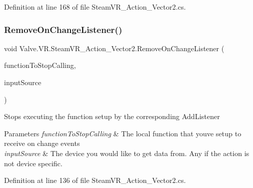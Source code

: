 Definition at line 168 of file Steam\+V\+R\+\_\+\+Action\+\_\+\+Vector2.\+cs.

\mbox{\label{class_valve_1_1_v_r_1_1_steam_v_r___action___vector2_a7449f5403cd5c68579091d9ab4f6084f}} 
\subsubsection{\texorpdfstring{RemoveOnChangeListener()}{RemoveOnChangeListener()}}
{\footnotesize\ttfamily void Valve.\+V\+R.\+Steam\+V\+R\+\_\+\+Action\+\_\+\+Vector2.\+Remove\+On\+Change\+Listener (\begin{DoxyParamCaption}\item[{\mbox{\hyperlink{class_valve_1_1_v_r_1_1_steam_v_r___action___vector2_ad390de62736aedd5be93238b1840ffec}{Change\+Handler}}}]{function\+To\+Stop\+Calling,  }\item[{\mbox{\hyperlink{namespace_valve_1_1_v_r_a82e5bf501cc3aa155444ee3f0662853f}{Steam\+V\+R\+\_\+\+Input\+\_\+\+Sources}}}]{input\+Source }\end{DoxyParamCaption})}



Stops executing the function setup by the corresponding Add\+Listener 


\begin{DoxyParams}{Parameters}
{\em function\+To\+Stop\+Calling} & The local function that you\textquotesingle{}ve setup to receive on change events\\
\hline
{\em input\+Source} & The device you would like to get data from. Any if the action is not device specific.\\
\hline
\end{DoxyParams}


Definition at line 136 of file Steam\+V\+R\+\_\+\+Action\+\_\+\+Vector2.\+cs.

\mbox{\label{class_valve_1_1_v_r_1_1_steam_v_r___action___vector2_a615865386254c66852cf687a8e330c3c}} 
